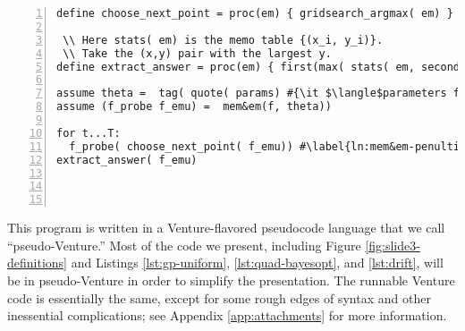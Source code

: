 \begin{lstlisting}[frame=single,escapechar=\#,numbers=left,numbersep=5pt,numberstyle=\tiny\color{gray}]
define choose_next_point = proc(em) { gridsearch_argmax( em) }

 \\ Here stats( em) is the memo table {(x_i, y_i)}.
 \\ Take the (x,y) pair with the largest y.
define extract_answer = proc(em) { first(max( stats( em, second)))}
 
assume theta =  tag( quote( params) #{\it $\langle$parameters for the statistical emulator$\rangle$}#))
assume (f_probe f_emu) =  mem&em(f, theta))

for t...T:
  f_probe( choose_next_point( f_emu)) #\label{ln:mem&em-penultimate}#
extract_answer( f_emu)    
    
       
      
\end{lstlisting}
This program is written in a Venture-flavored pseudocode language that we call
``pseudo-Venture.''  Most of the code we present, including Figure
\ref{fig:slide3-definitions} and Listings \ref{lst:gp-uniform},
\ref{lst:quad-bayesopt}, and \ref{lst:drift}, will be in pseudo-Venture in order
to simplify the presentation.  The runnable Venture code is essentially the
same, except for some rough edges of syntax and other inessential complications;
see Appendix \ref{app:attachments} for more information.

